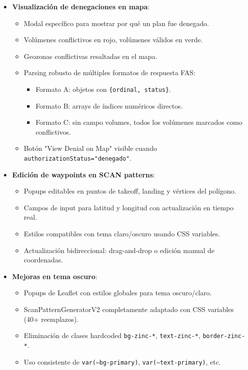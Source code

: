 \documentclass[12pt,a4paper]{article}
\begin{document}
\begin{itemize}
\begin{itemize}
    \end{itemize}
    \item \textbf{Visualización de denegaciones en mapa}:
    \begin{itemize}
        \item Modal específico para mostrar por qué un plan fue denegado.
        \item Volúmenes conflictivos en rojo, volúmenes válidos en verde.
        \item Geozonas conflictivas resaltadas en el mapa.
        \item Parsing robusto de múltiples formatos de respuesta FAS:
        \begin{itemize}
            \item Formato A: objetos con \texttt{\{ordinal, status\}}.
            \item Formato B: arrays de índices numéricos directos.
            \item Formato C: sin campo volumes, todos los volúmenes marcados como conflictivos.
        \end{itemize}
        \item Botón "View Denial on Map" visible cuando \texttt{authorizationStatus="denegado"}.
    \end{itemize}
    \item \textbf{Edición de waypoints en SCAN patterns}:
    \begin{itemize}
        \item Popups editables en puntos de takeoff, landing y vértices del polígono.
        \item Campos de input para latitud y longitud con actualización en tiempo real.
        \item Estilos compatibles con tema claro/oscuro usando CSS variables.
        \item Actualización bidireccional: drag-and-drop o edición manual de coordenadas.
    \end{itemize}
    \item \textbf{Mejoras en tema oscuro}:
    \begin{itemize}
        \item Popups de Leaflet con estilos globales para tema oscuro/claro.
        \item ScanPatternGeneratorV2 completamente adaptado con CSS variables (40+ reemplazos).
        \item Eliminación de clases hardcoded \texttt{bg-zinc-*}, \texttt{text-zinc-*}, \texttt{border-zinc-*}.
        \item Uso consistente de \texttt{var(--bg-primary)}, \texttt{var(--text-primary)}, etc.

\end{itemize}
\end{itemize}
\end{document}
